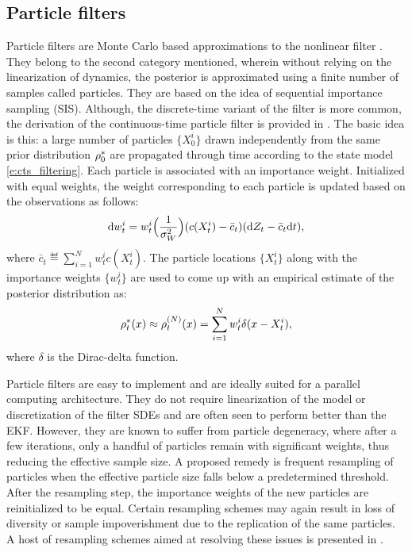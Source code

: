 \subsection{Particle filters}
\label{e:particle}
Particle filters are Monte Carlo based approximations to the nonlinear filter \cite{doucet2000sequential}.  They belong to the second category mentioned, wherein without relying on the linearization of dynamics, the posterior is approximated using a finite number of samples called particles. They are based on the idea of sequential importance sampling (SIS). Although, the discrete-time variant of the filter is more common, the derivation of the continuous-time particle filter is provided in \cite{kutsurpfi19}. The basic idea is this: a large number of particles $\{X^i_0\}$ drawn independently from the same prior distribution $\rho^*_0$ are propagated through time according to the state model \eqref{e:cts_filtering}. Each particle is associated with an importance weight. Initialized with equal weights, the weight corresponding to each particle is updated based on the observations as follows:
\begin{equation}
\ud w^i_t = w^i_t  \Bigl(\frac{1}{\sigma^2_W} \Bigr) (c(X^i_t)  - \bar{c}_t ) (\ud Z_t - \bar{c}_t \ud t),
\label{e:particle_wt}
\end{equation}
where $\bar{c}_t \eqdef \sum_{i=1}^N w^i_t c(X^i_t)$. The particle locations $\{X^i_t\}$ along with the importance weights $\{w^i_t\}$ are used to come up with an empirical estimate of the posterior distribution as:
\begin{equation}
\pr^*_t(x) \approx \pr^{(N)}_t(x) = \sum_{i=1}^N w^i_t \delta(x -X^i_t),
\label{e:particle_empirical}
\end{equation}
where $\delta$ is the Dirac-delta function. 

Particle filters are easy to implement and are ideally suited for a parallel computing architecture. They do not require linearization of the model or discretization of the filter SDEs and are often seen to perform better than the EKF. However, they are known to suffer from particle degeneracy, where after a few iterations, only a handful of particles remain with significant weights, thus reducing the effective sample size. A proposed remedy is frequent resampling of particles when the effective particle size falls below a predetermined threshold. After the resampling step, the importance weights of the new particles are reinitialized to be equal. Certain resampling schemes may again result in loss of diversity or sample impoverishment due to the replication of the same particles. A host of resampling schemes aimed at resolving these issues is presented in \cite{budchelee07, arumasgorcla02}.
 
